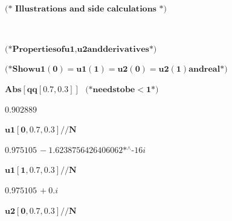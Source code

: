 {\begin{doublespace}
\noindent\(\pmb{\text{}}\)
\end{doublespace}

\begin{doublespace}
\noindent\(\pmb{\text{(* Illustrations and side calculations *)}}\)
\end{doublespace}

\begin{doublespace}
\noindent\(\pmb{\text{}}\)
\end{doublespace}

\begin{doublespace}
\noindent\(\pmb{\text{(*} \text{Properties} \text{of} \text{u1}, \text{u2} \text{and} \text{derivatives} \text{*)}}\)
\end{doublespace}

\begin{doublespace}
\noindent\(\pmb{\text{(*} \text{Show} \text{u1}(0)=\text{u1}(1)=\text{u2}(0)=\text{u2}(1) \text{and} \text{real} \text{*)}}\)
\end{doublespace}

\begin{doublespace}
\noindent\(\pmb{\text{Abs}[\text{qq}[0.7,0.3]]\text{    }\text{(*} \text{needs} \text{to} \text{be} <1 \text{*)}}\)
\end{doublespace}

\begin{doublespace}
\noindent\(0.902889\)
\end{doublespace}

\begin{doublespace}
\noindent\(\pmb{\text{u1}[0,0.7,0.3] \text{//}N}\)
\end{doublespace}

\begin{doublespace}
\noindent\(0.975105\, -\text{1.6238756426406062$\grave{ }$*${}^{\wedge}$-16} i\)
\end{doublespace}

\begin{doublespace}
\noindent\(\pmb{\text{u1}[1,0.7,0.3] \text{//}N}\)
\end{doublespace}

\begin{doublespace}
\noindent\(0.975105\, +0. i\)
\end{doublespace}

\begin{doublespace}
\noindent\(\pmb{\text{u2}[0,0.7,0.3] \text{//}N}\)
\end{doublespace}

}
